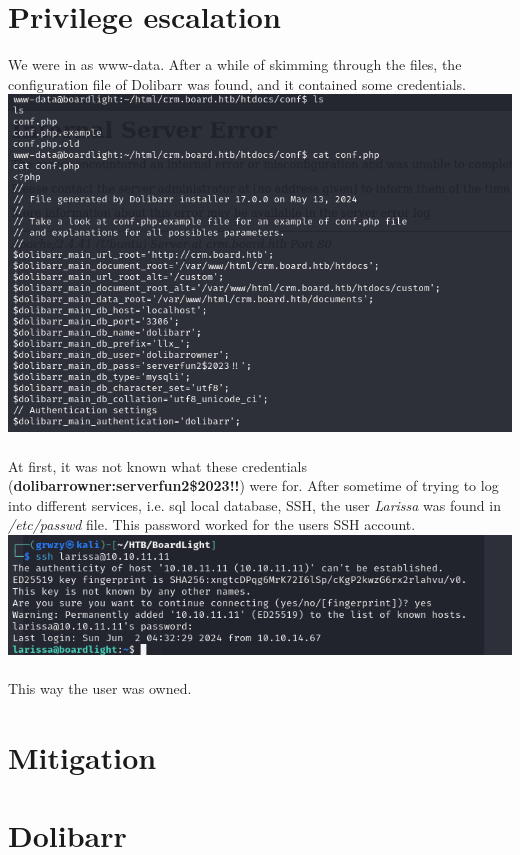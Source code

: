 \documentclass[12pt, letterpaper]{article}
\begin{document}
\section{Privilege escalation}
We were in as www-data. After a while of skimming through the files, the configuration file of
Dolibarr was found, and it contained some credentials. \\

\includegraphics[width=\textwidth]{ dolibarr-conf-file.png } \\\\

At first, it was not known what these credentials (\textbf{dolibarrowner:serverfun2\$2023!!})
were for. After sometime of trying to log into different services, i.e. sql local database,
SSH, the user \textit{Larissa} was found in \textit{/etc/passwd} file. This password
worked for the users SSH account. \\

\includegraphics[width=\textwidth]{ larissa-ssh-sess.png } \\\\

This way the user was owned.

\section{Mitigation}

\section{Dolibarr}
\end{document}

